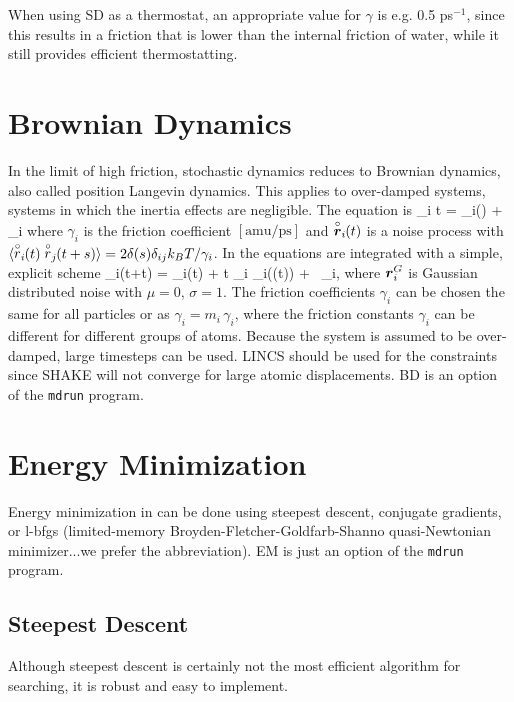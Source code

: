 When using SD as a thermostat, an appropriate value for $\gamma$ is e.g. 0.5 ps$^{-1}$,
since this results in a friction that is lower than the internal friction
of water, while it still provides efficient thermostatting.


\section{Brownian Dynamics}
\label{sec:BD}
In the limit of high friction, stochastic dynamics reduces to 
Brownian dynamics, also called position Langevin dynamics.
This applies to over-damped systems, 
{\ie} systems in which the inertia effects are negligible.
The equation is
\beq
{\de {}_i \over \de t} =  _i() + \vrond_i
\eeq 
where $\gamma_i$ is the friction coefficient $[\mbox{amu/ps}]$ and
$\vrond_i\!\!(t)$  is a noise process with 
$\langle \rond_i\!\!(t) \rond_j\!\!(t+s) \rangle = 
    2 \delta(s) \delta_{ij} k_B T / \gamma_i$.
In {\gromacs} the equations are integrated with a simple, explicit scheme
\beq
{}_i(t+\Delta t) = _i(t) +
        {\Delta t \over \gamma_i} _i((t)) 
        + \, \ruis_i,
\eeq
where $\ruis_i$ is Gaussian distributed noise with $\mu = 0$, $\sigma = 1$.
The friction coefficients $\gamma_i$ can be chosen the same for all
particles or as $\gamma_i = m_i\,\gamma_i$, where the friction constants
$\gamma_i$ can be different for different groups of atoms. 
Because the system is assumed to be over-damped, large timesteps
can be used. LINCS should be used for the constraints since SHAKE
will not converge for large atomic displacements.
BD is an option of the {\tt mdrun} program.

\section{Energy Minimization}
\label{sec:EM}%
Energy minimization in {\gromacs} can be done using steepest descent,
conjugate gradients, or l-bfgs (limited-memory
Broyden-Fletcher-Goldfarb-Shanno quasi-Newtonian minimizer...we
prefer the abbreviation). EM is just an option of the {\tt mdrun}
program.

\subsection{Steepest Descent}
Although steepest descent is certainly not the most efficient
algorithm for searching, it is robust and easy to implement.

